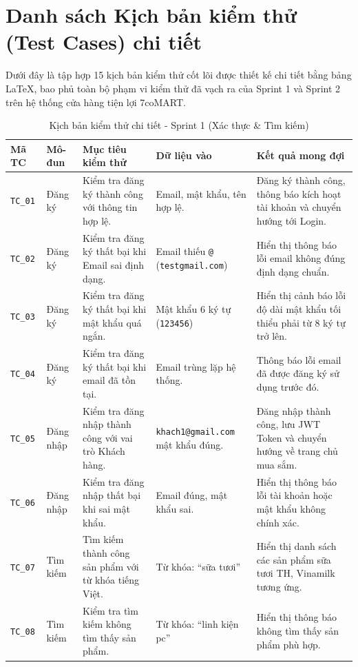 \section{Danh sách Kịch bản kiểm thử (Test Cases) chi tiết}
Dưới đây là tập hợp 15 kịch bản kiểm thử cốt lõi được thiết kế chi tiết bằng bảng LaTeX, bao phủ toàn bộ phạm vi kiểm thử đã vạch ra của Sprint 1 và Sprint 2 trên hệ thống cửa hàng tiện lợi 7coMART.

\begin{table}[H]
\centering
\caption{Kịch bản kiểm thử chi tiết - Sprint 1 (Xác thực \& Tìm kiếm)}
\renewcommand{\arraystretch}{1.2}
\small
\begin{tabular}{|p{1.2cm}|p{1.8cm}|p{3.5cm}|p{2.5cm}|p{5.5cm}|}
\hline
\textbf{Mã TC} & \textbf{Mô-đun} & \textbf{Mục tiêu kiểm thử} & \textbf{Dữ liệu vào} & \textbf{Kết quả mong đợi} \\ \hline
\texttt{TC\_01} & Đăng ký & Kiểm tra đăng ký thành công với thông tin hợp lệ. & Email, mật khẩu, tên hợp lệ. & Đăng ký thành công, thông báo kích hoạt tài khoản và chuyển hướng tới Login. \\ \hline
\texttt{TC\_02} & Đăng ký & Kiểm tra đăng ký thất bại khi Email sai định dạng. & Email thiếu \texttt{@} (\texttt{testgmail.com}) & Hiển thị thông báo lỗi email không đúng định dạng chuẩn. \\ \hline
\texttt{TC\_03} & Đăng ký & Kiểm tra đăng ký thất bại khi mật khẩu quá ngắn. & Mật khẩu 6 ký tự (\texttt{123456}) & Hiển thị cảnh báo lỗi độ dài mật khẩu tối thiểu phải từ 8 ký tự trở lên. \\ \hline
\texttt{TC\_04} & Đăng ký & Kiểm tra đăng ký thất bại khi email đã tồn tại. & Email trùng lặp hệ thống. & Thông báo lỗi email đã được đăng ký sử dụng trước đó. \\ \hline
\texttt{TC\_05} & Đăng nhập & Kiểm tra đăng nhập thành công với vai trò Khách hàng. & \texttt{khach1@gmail.com} mật khẩu đúng. & Đăng nhập thành công, lưu JWT Token và chuyển hướng về trang chủ mua sắm. \\ \hline
\texttt{TC\_06} & Đăng nhập & Kiểm tra đăng nhập thất bại khi sai mật khẩu. & Email đúng, mật khẩu sai. & Hiển thị thông báo lỗi tài khoản hoặc mật khẩu không chính xác. \\ \hline
\texttt{TC\_07} & Tìm kiếm & Tìm kiếm thành công sản phẩm với từ khóa tiếng Việt. & Từ khóa: ``sữa tươi'' & Hiển thị danh sách các sản phẩm sữa tươi TH, Vinamilk tương ứng. \\ \hline
\texttt{TC\_08} & Tìm kiếm & Kiểm tra tìm kiếm không tìm thấy sản phẩm. & Từ khóa: ``linh kiện pc'' & Hiển thị thông báo không tìm thấy sản phẩm phù hợp. \\ \hline
\end{tabular}
\end{table}


